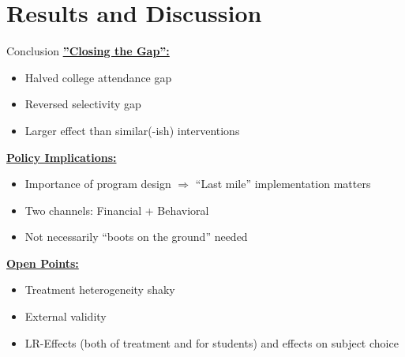 \section{Results and Discussion} 

\begin{frame}{Conclusion}
\vfill
\hspace{0.2em} \faCheckCircle  \hspace{0.5em} \textbf{\underline{''Closing the Gap'':}}
\begin{small}
\begin{itemize}
  \addtolength{\itemindent}{0.45cm}
\item Halved college attendance gap
\item Reversed selectivity gap
\item Larger effect than similar(-ish) interventions 
\end{itemize}
\end{small}
\vfill
\pause
\hspace{0.2em} \faFlagCheckered  \hspace{0.5em} \textbf{\underline{Policy Implications:}}
\begin{small}
\begin{itemize}
  \addtolength{\itemindent}{0.45cm}
\item Importance of program design $\Rightarrow$ ``Last mile'' implementation matters
\item Two channels: Financial + Behavioral 
\item Not necessarily  ``boots on the ground'' needed
\end{itemize}
\end{small}
\pause
\vfill
\hspace{0.2em} \faQuestion \hspace{0.5em} \textbf{\underline{Open Points:}} 
\begin{small}
\begin{itemize}
  \addtolength{\itemindent}{0.45cm}
\item Treatment heterogeneity shaky
\item External validity
\item LR-Effects (both of treatment and for students) and effects on subject choice
\end{itemize}
\end{small}
\end{frame}
